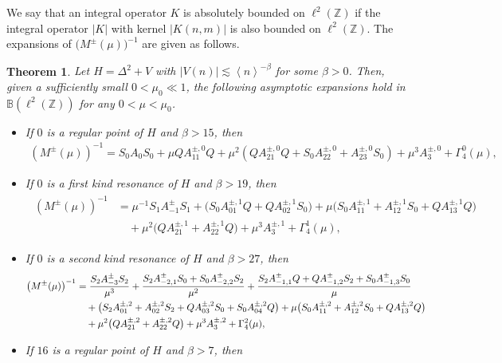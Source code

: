 \documentclass[reqno, 11pt]{amsart}
\newtheorem{theorem}[definition]{Theorem}
\newcommand\Z{\mathbb{Z}}
\newcommand\B{\mathbb{B}}
\numberwithin{equation}{section}
\begin{document}
We say that an integral operator $K$ is absolutely bounded on $\ell^2(\Z)$ if the integral operator $|K|$ with kernel $|K(n,m)|$ is also bounded on $\ell^2(\mathbb Z)$. The expansions of $\bigl(M^\pm(\mu)\bigr)^{-1}$ are given as follows.
\begin{theorem}\label{Asymptotic expansion theorem}
Let $H=\Delta^2+V$ with $|V(n)|\lesssim \left<n\right>^{-\beta}$ for some $\beta>0$. 
Then, given a sufficiently small $0<\mu_0\ll1$, the following asymptotic expansions hold in $\B(\ell^2(\Z))$ for any $0<\mu<\mu_0$.
\begin{itemize}
\item[{\rm(i)}] If $0$ is a regular point of $H$ and $\beta>15$, then
\begin{align}\label{asy expan of regular 0}
\left(M^{\pm}(\mu)\right)^{-1}=S_0A_{0}S_0+\mu QA^{\pm,0}_{11}Q+\mu^2(QA^{\pm,0}_{21}Q+S_0A^{\pm,0}_{22}+A^{\pm,0}_{23}S_0)+\mu^3A^{\pm,0}_3+\Gamma^{0}_{4}(\mu),
\end{align}
\item [{\rm(ii)}] If $0$ is a first kind resonance of $H$ and $\beta>19$, then
\begin{align}\label{asy expan of 1st 0}
\begin{split}
\left(M^{\pm}(\mu)\right)^{-1}&=\mu^{-1}S_{1}A^{\pm}_{-1}S_{1}+\big(S_0A^{\pm,1}_{01}Q+QA^{\pm,1}_{02}S_0\big)+\mu\big(S_0A^{\pm,1}_{11}+A^{\pm,1}_{12}S_0+QA^{\pm,1}_{13}Q\big)\\
&\quad+\mu^2\big(QA^{\pm,1}_{21}+A^{\pm,1}_{22}Q\big)+\mu^3A^{\pm,1}_{3}+\Gamma^{1}_{4}(\mu),
\end{split}
\end{align}
\item [{\rm(iii)}] If $0$ is a second kind resonance of $H$ and $\beta>27$, then
\begin{align}\label{asy expan 2nd 0}
\left(M^{\pm}(\mu)\right)^{-1}&=\frac{S_{2}A^{\pm}_{-3}S_{2}}{\mu^3}+\frac{S_2A^{\pm}_{-2,1}S_0+S_0A^{\pm}_{-2,2}S_2}{\mu^2}
+\frac{S_2A^{\pm}_{-1,1}Q+QA^{\pm}_{-1,2}S_2+S_0A^{\pm}_{-1,3}S_0}{\mu}\notag\\
 &\quad+\big(S_2A^{\pm,2}_{01}+A^{\pm,2}_{02}S_2+QA^{\pm,2}_{03}S_0+S_0A^{\pm,2}_{04}Q\big)+\mu\big(S_0A^{\pm,2}_{11}+A^{\pm,2}_{12}S_0+QA^{\pm,2}_{13}Q\big)\notag\\
&\quad+\mu^2\big(QA^{\pm,2}_{21}+A^{\pm,2}_{22}Q\big)+\mu^3A^{\pm,2}_{3}+\Gamma^{2}_{4}(\mu),
\end{align}
\item[{\rm(iv)}] If $16$ is a regular point of $H$ and $\beta>7$, then

\end{itemize}
\end{theorem}
\end{document}
